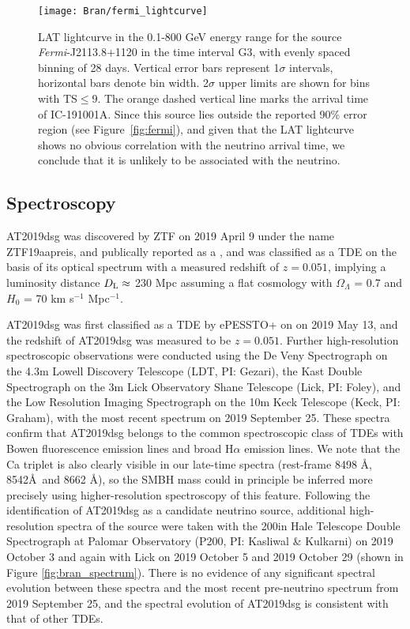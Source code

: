 \begin{figure}
	\centering
	\texttt{[image: Bran/fermi\_lightcurve]}
	\caption{LAT lightcurve in the 0.1-800 GeV energy range for the source \textit{Fermi}-J2113.8+1120 in the time interval G3, with evenly spaced binning of 28 days. Vertical error bars represent 1$\sigma$ intervals, horizontal bars denote bin width. 2$\sigma$ upper limits are shown for bins with TS$\leq$9. The orange dashed vertical line marks the arrival time of IC-191001A. Since this source lies outside the reported 90\% error region (see Figure~\ref{fig:fermi}), and given that the LAT lightcurve shows no obvious correlation with the neutrino arrival time, we conclude that it is unlikely to be associated with the neutrino.}
	\label{fig:fermi_lc}
\end{figure}


\subsection{Spectroscopy}


AT2019dsg was discovered by ZTF on 2019 April 9 under the name ZTF19aapreis, and publically reported as a  , and was classified as a TDE on the basis of its optical spectrum\cite{2019ATel12752....1N} with a measured redshift of $z=0.051$, implying a luminosity distance $D_{\textup{L}} \approx$ 230 Mpc assuming a flat cosmology with $\Omega_{\Lambda}$ = 0.7 and $H_{0}$ = 70 km s$^{-1}$ Mpc$^{-1}$.

AT2019dsg was first classified as a TDE by ePESSTO+ on on 2019 May 13\cite{2019ATel12752....1N}, and the redshift of AT2019dsg was measured to be $z=0.051$. Further high-resolution spectroscopic observations were conducted using the De Veny Spectrograph on the 4.3m Lowell Discovery Telescope (LDT, PI: Gezari), the Kast Double Spectrograph on the 3m Lick Observatory Shane Telescope (Lick, PI: Foley)\cite{Miller93}, and the Low Resolution Imaging Spectrograph on the 10m Keck Telescope (Keck, PI: Graham)\cite{Oke95}, with the most recent spectrum on 2019 September 25. These spectra confirm that AT2019dsg belongs to the common spectroscopic class of TDEs with Bowen fluorescence emission lines and broad H$\alpha$ emission lines\cite{2020arXiv200101409V}. We note that the Ca triplet is also clearly visible in our late-time spectra (rest-frame 8498 \AA, 8542\AA ~and 8662 \AA), so the SMBH mass could in principle be inferred more precisely using higher-resolution spectroscopy of this feature\cite{2005MNRAS.359..765G}. Following the identification of AT2019dsg as a candidate neutrino source, additional high-resolution spectra of the source were taken with the 200in Hale Telescope Double Spectrograph at Palomar Observatory (P200, PI: Kasliwal \& Kulkarni) on 2019 October 3 and again with  Lick on 2019 October 5 and 2019 October 29 (shown in Figure \ref{fig:bran_spectrum}). There is no evidence of any significant spectral evolution between these spectra and the most recent pre-neutrino spectrum from 2019 September 25, and the spectral evolution of AT2019dsg is consistent with that of other TDEs\cite{2020arXiv200101409V}. 

